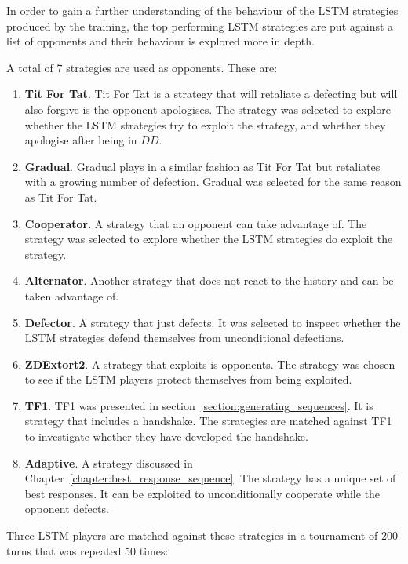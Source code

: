 In order to gain a further understanding of the behaviour of the LSTM strategies
produced by the training, the top performing LSTM strategies are put against a
list of opponents and their behaviour is explored more in depth.

A total of 7 strategies are used as opponents. These are:

\begin{enumerate}
    \item \textbf{Tit For Tat}. Tit For Tat is a strategy that will retaliate
    a defecting but will also forgive is the opponent apologises. The strategy was
    selected to explore whether the LSTM strategies try to exploit the strategy,
    and whether they apologise after being in \(DD\).
    \item \textbf{Gradual}. Gradual plays in a similar fashion as Tit For Tat but
    retaliates with a growing number of defection. Gradual was selected for the
    same reason as Tit For Tat.
    \item \textbf{Cooperator}. A strategy that an opponent can take advantage
    of. The strategy was selected to explore whether the LSTM strategies do
    exploit the strategy.
    \item \textbf{Alternator}. Another strategy that does not react to the history
    and can be taken advantage of.
    \item \textbf{Defector}. A strategy that just defects. It was selected to inspect
    whether the LSTM strategies defend themselves from unconditional defections.
    \item \textbf{ZDExtort2}. A strategy that exploits is opponents. The
    strategy was chosen to see if the LSTM players protect themselves from being
    exploited.
    \item \textbf{TF1}. TF1 was presented in
    section~\ref{section:generating_sequences}. It is strategy that includes a
    handshake. The strategies are matched against TF1 to investigate whether they
    have developed the handshake.
    \item \textbf{Adaptive}. A strategy discussed in
    Chapter~\ref{chapter:best_response_sequence}. The strategy has a unique set
    of best responses. It can be exploited to unconditionally cooperate while
    the opponent defects.
\end{enumerate}

Three LSTM players are matched against these strategies in a tournament of
200 turns that was repeated 50 times:


